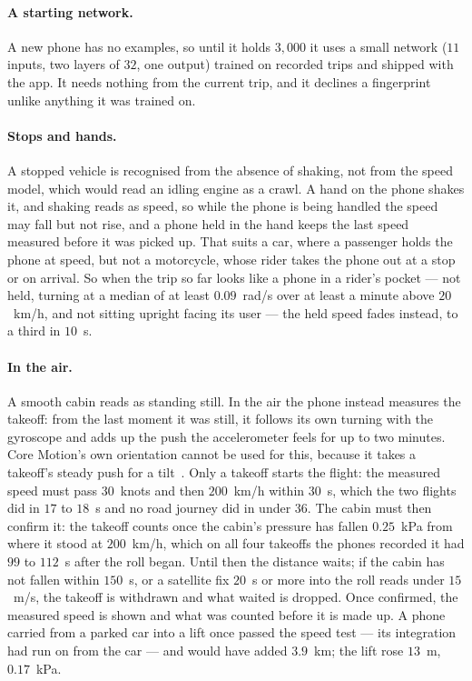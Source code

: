 \documentclass[11pt]{article}
\begin{document}
\paragraph{A starting network.} A new phone has no examples, so until it holds $3{,}000$ it uses a
small network ($11$ inputs, two layers of $32$, one output) trained on recorded trips and shipped with
the app. It needs nothing from the current trip, and it declines a fingerprint unlike anything it was
trained on.

\paragraph{Stops and hands.} A stopped vehicle is recognised from the absence of shaking, not from
the speed model, which would read an idling engine as a crawl. A hand on the phone shakes it, and
shaking reads as speed, so while the phone is being handled the speed may fall but not rise, and a
phone held in the hand keeps the last speed measured before it was picked up. That suits a car, where a
passenger holds the phone at speed, but not a motorcycle, whose rider takes the phone out at a stop or on
arrival. So when the trip so far looks like a phone in a rider's pocket --- not held, turning at a median of
at least $0.09$~rad/s over at least a minute above $20$~km/h, and not sitting upright facing its user --- the
held speed fades instead, to a third in $10$~s.

\paragraph{In the air.} A smooth cabin reads as standing still. In the air the phone instead measures
the takeoff: from the last moment it was still, it follows its own turning with the gyroscope and
adds up the push the accelerometer feels for up to two minutes. Core Motion's own orientation cannot
be used for this, because it takes a takeoff's steady push for a tilt~\cite{quatcf}. Only a takeoff
starts the flight: the measured speed must pass $30$~knots and then $200$~km/h within $30$~s, which the
two flights did in $17$ to $18$~s and no road journey did in under $36$. The cabin must then confirm it:
the takeoff counts once the cabin's pressure has fallen $0.25$~kPa from where it stood at $200$~km/h, which on
all four takeoffs the phones recorded it had $99$ to $112$~s after the roll began. Until then the distance
waits; if the cabin has not fallen within $150$~s, or a satellite fix $20$~s or more into the roll reads
under $15$~m/s, the takeoff is withdrawn and what waited is dropped. Once confirmed, the measured speed is
shown and what was counted before it is made up. A phone carried from a parked car into a lift once
passed the speed test --- its integration had run on from the car --- and would have added $3.9$~km; the
lift rose $13$~m, $0.17$~kPa.
\end{document}
